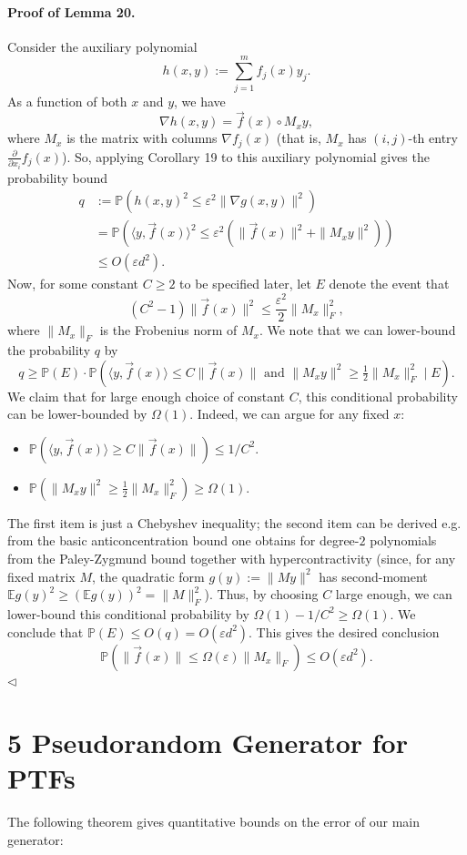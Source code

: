 \documentclass[10pt,a4paper]{article}
\begin{document}
\paragraph{Proof of Lemma 20.} Consider the auxiliary polynomial
\[h(x,y):=\sum_{j=1}^mf_j(x)y_j.\]
As a function of both $x$ and $y$, we have
\[\nabla h(x,y)=\vec f(x)\circ M_xy,\]
where $M_x$ is the matrix with columns $\nabla f_j(x)$ (that is, $M_x$ has $(i,j)$-th entry $\frac\partial{\partial x_i}f_j(x)$). So, applying Corollary 19 to this auxiliary polynomial gives the probability bound
\begin{align*}
q&:=\mathbb P(h(x,y)^2\leq\varepsilon^2\|\nabla g(x,y)\|^2)\\
&=\mathbb P(\langle y,\vec f(x)\rangle^2\leq\varepsilon^2(\|\vec f(x)\|^2+\|M_xy\|^2))\\
&\leq O(\varepsilon d^2).
\end{align*}
Now, for some constant $C\geq2$ to be specified later, let $E$ denote the event that
\[(C^2-1)\|\vec f(x)\|^2\leq\frac{\varepsilon^2}2\|M_x\|_F^2,\]
where $\|M_x\|_F$ is the Frobenius norm of $M_x$. We note that we can lower-bound the probability $q$ by
\[q\geq\mathbb P(E)\cdot\mathbb P(\langle y,\vec f(x)\rangle\leq C\|\vec f(x)\|\text{ and }\|M_xy\|^2\geq\tfrac12\|M_x\|_F^2\mid E).\]
We claim that for large enough choice of constant $C$, this conditional probability can be lower-bounded by $\Omega(1)$. Indeed, we can argue for any fixed $x$:
\begin{itemize}
\item $\mathbb P(\langle y,\vec f(x)\rangle\geq C\|\vec f(x)\|)\leq1/C^2$.
\item $\mathbb P(\|M_xy\|^2\geq\tfrac12\|M_x\|_F^2)\geq\Omega(1)$.
\end{itemize}
The first item is just a Chebyshev inequality; the second item can be derived e.g. from the basic anticoncentration bound one obtains for degree-$2$ polynomials from the Paley-Zygmund bound together with hypercontractivity (since, for any fixed matrix $M$, the quadratic form $g(y):=\|My\|^2$ has second-moment $\mathbb Eg(y)^2\geq(\mathbb Eg(y))^2=\|M\|_F^2$).
Thus, by choosing $C$ large enough, we can lower-bound this conditional probability by $\Omega(1)-1/C^2\geq\Omega(1)$.
We conclude that $\mathbb P(E)\leq O(q)=O(\varepsilon d^2)$. This gives the desired conclusion
\[\mathbb P(\|\vec f(x)\|\leq\Omega(\varepsilon)\|M_x\|_F)\leq O(\varepsilon d^2).\]\hfill$\triangleleft$
\section*{5 Pseudorandom Generator for PTFs}
The following theorem gives quantitative bounds on the error of our main generator:
\end{document}
